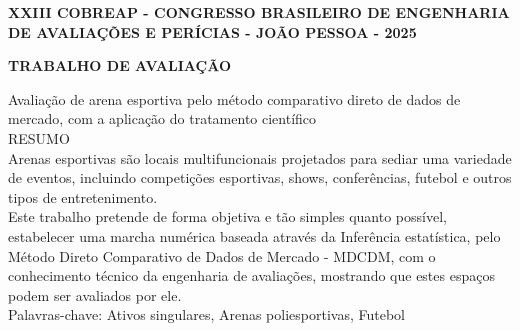  
\begin{center}
	\textbf{XXIII COBREAP - CONGRESSO BRASILEIRO DE ENGENHARIA DE AVALIAÇÕES E PERÍCIAS - JOÃO PESSOA - 2025}
\end{center}
\begin{center}
	\textbf{TRABALHO DE AVALIAÇÃO}
\end{center}

Avaliação de arena esportiva pelo método comparativo direto de dados de mercado, com a aplicação do tratamento científico\\ 
RESUMO\\ 
Arenas esportivas são locais multifuncionais projetados para sediar uma variedade de eventos, incluindo competições esportivas, shows, conferências, futebol e outros tipos de entretenimento.\\ 


Este trabalho pretende de forma objetiva e tão simples quanto possível, estabelecer uma marcha numérica baseada através da Inferência estatística, pelo Método Direto Comparativo de Dados de Mercado - MDCDM, com o conhecimento técnico da engenharia de avaliações, mostrando que estes espaços podem ser avaliados por ele.\\ 
Palavras-chave: Ativos singulares, Arenas poliesportivas, Futebol
